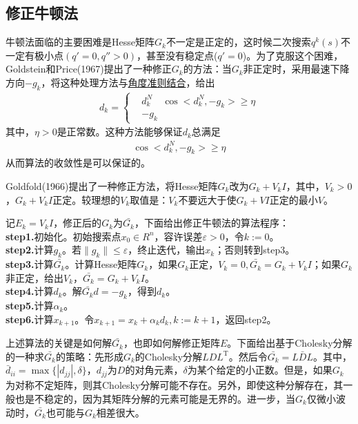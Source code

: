     \subsection{修正牛顿法}
        \par
        牛顿法面临的主要困难是Hesse矩阵$G_k$不一定是正定的，这时候二次搜索$q^k(s)$不一定有极小点$(q'=0,q'' > 0)$，甚至没有稳定点($q'=0$)。为了克服这个困难，Goldstein和Price(1967)提出了一种修正$G_k$的方法：当$G_k$非正定时，采用最速下降方向$-g_k$，将这种处理方法与\underline{角度准则结合}，给出
        \begin{align*}
        d_k=\left\{
        \begin{aligned}
        &d_k^N \quad \cos \big< {d_k^N,-g_k} \big>\geqslant \eta\\
        &-g_k
        \end{aligned}
        \right.
        \end{align*}
        其中，$\eta >0$是正常数。这种方法能够保证$d_k$总满足
         \begin{align*}
          \cos \big< {d_k^N,-g_k} \big>\geqslant \eta
        \end{align*}
        从而算法的收敛性是可以保证的。
        \par
        Goldfold(1966)提出了一种修正方法，将Hesse矩阵$G_k$改为$G_k+V_k I$，其中，$V_k>0$，$G_k+V_k I$正定。较理想的$V_k$取值是：$V_k$不要远大于使$G_k+V I$正定的最小$V$。
        \par
        记$E_k=V_kI$，修正后的$G_k$为$\bar{G_k}$，下面给出修正牛顿法的算法程序：\\
        \textbf{step1.}初始化。初始搜索点$x_0 \in R^n$，容许误差$\varepsilon >0$，令$k:=0$。\\
        \textbf{step2.}计算$g_k$。若$\|g_k\| \leqslant \varepsilon $，终止迭代，输出$x_k$；否则转到step3。\\
        \textbf{step3.}计算$\bar{G_k}$。计算Hesse矩阵$G_k$，如果$G_k$正定，$V_k=0,\bar{G_k}=G_k+V_k I$；如果$G_k$非正定，给出$V_k$，$\bar{G_k}=G_k+V_k I$。\\
        \textbf{step4.}计算$d_k$。解$\bar{G_k}d=-g_k$，得到$d_k$。\\
        \textbf{step5.}计算${\alpha}_k$。\\
        \textbf{step6.}计算$x_{k+1}$。令$x_{k+1}=x_{k}+{\alpha}_k d_k,k:=k+1$，返回step2。
        \par
        上述算法的关键是如何解$\bar{G_k}$，也即如何解修正矩阵$E$。下面给出基于Cholesky分解的一种求$\bar{G_k}$的策略：先形成$G_k$的Cholesky分解${LDL}^\mathrm{T} $。然后令$\bar{G_k}=L\bar{D}L$。其中，$\bar{d}_{ii}=\max \{|d_{jj}|,\delta\}$，$d_{jj}$为$D$的对角元素，$\delta$为某个给定的小正数。但是，如果${G_k}$为对称不定矩阵，则其Cholesky分解可能不存在。另外，即使这种分解存在，其一般也是不稳定的，因为其矩阵分解的元素可能是无界的。进一步，当$G_k$仅微小波动时，$\bar{G_k}$也可能与$G_k$相差很大。
